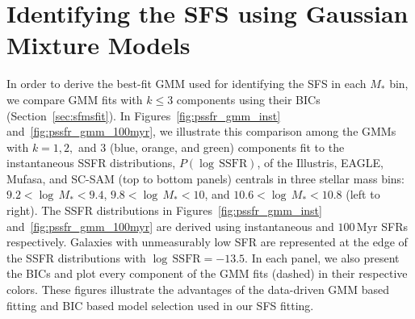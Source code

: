 \documentclass[tighten, preprint]{aastex62}
\begin{document}
\section{Identifying the SFS using Gaussian Mixture Models} \label{app:gmm_pssfr}
In order to derive the best-fit GMM used for identifying the SFS in 
each $M_*$ bin, we compare GMM fits with $k\leq 3$ components using
their BICs (Section~\ref{sec:sfmsfit}). In Figures~\ref{fig:pssfr_gmm_inst} 
and~\ref{fig:pssfr_gmm_100myr}, we illustrate this comparison among the  
GMMs with $k=1, 2,$ and $3$ (blue, orange, and green) components fit
to the instantaneous SSFR distributions, $P(\log\,\mathrm{SSFR})$, of the 
Illustris, EAGLE, {\sc Mufasa}, and SC-SAM (top to bottom panels) centrals 
in three stellar mass bins: 
$9.2 <\log\,M_*<9.4$, $9.8 <\log\,M_*<10$, and $10.6 <\log\,M_*<10.8$ (left to right). 
The SSFR distributions in Figures~\ref{fig:pssfr_gmm_inst} 
and~\ref{fig:pssfr_gmm_100myr} are derived using instantaneous and 
$100\,\mathrm{Myr}$ SFRs respectively. Galaxies with unmeasurably low SFR %
are represented at the edge of the SSFR distributions with $\log\,\mathrm{SSFR}=-13.5$.
In each panel, we also present the BICs and plot every component of the 
GMM fits (dashed) in their respective colors. These figures illustrate
the advantages of the data-driven GMM based fitting and BIC based
model selection used in our SFS fitting.
\end{document}
